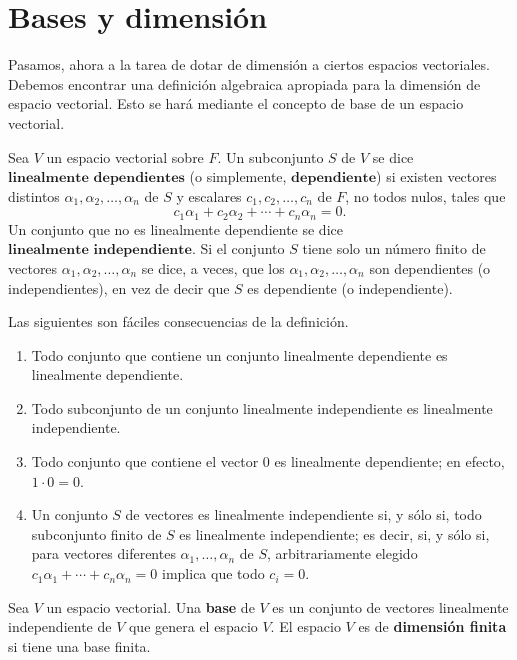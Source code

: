 \section{Bases y dimensión}

Pasamos, ahora a la tarea de dotar de dimensión a ciertos espacios vectoriales. Debemos encontrar una definición algebraica apropiada para la dimensión de espacio vectorial. Esto se hará mediante el concepto de base de un espacio vectorial.

\begin{def.}
    Sea $V$ un espacio vectorial sobre $F$. Un subconjunto $S$ de $V$ se dice $\textbf{linealmente dependientes}$ (o simplemente, $\textbf{dependiente}$) si existen vectores distintos $\alpha_1,\alpha_2,\ldots,\alpha_n$ de $S$ y escalares $c_1,c_2,\ldots,c_n$ de $F$, no todos nulos, tales que
    $$c_1\alpha_1+c_2\alpha_2+\cdots+c_n\alpha_n=0.$$
    Un conjunto que no es linealmente dependiente se dice $\textbf{linealmente independiente}$. Si el conjunto $S$ tiene solo un número finito de vectores $\alpha_1,\alpha_2,\ldots,\alpha_n$ se dice, a veces, que los $\alpha_1,\alpha_2,\ldots,\alpha_n$ son dependientes (o independientes), en vez de decir que $S$ es dependiente (o independiente).
\end{def.}

Las siguientes son fáciles consecuencias de la definición.

\begin{enumerate}[1.]

    \item Todo conjunto que contiene un conjunto linealmente dependiente es linealmente dependiente.
    \item Todo subconjunto de un conjunto linealmente independiente es linealmente independiente.
    \item Todo conjunto que contiene el vector $0$ es linealmente dependiente; en efecto, $1\cdot 0=0$.
    \item Un conjunto $S$ de vectores es linealmente independiente si, y sólo si, todo subconjunto finito de $S$ es linealmente independiente; es decir, si, y sólo si, para vectores diferentes $\alpha_1,\ldots,\alpha_n$ de $S$, arbitrariamente elegido $c_1\alpha_1+\cdots+c_n\alpha_n=0$ implica que todo $c_i=0$.

\end{enumerate}

\begin{def.}
    Sea $V$ un espacio vectorial. Una \textbf{base} de $V$ es un conjunto de vectores linealmente independiente de $V$ que genera el espacio $V$. El espacio $V$ es de \textbf{dimensión finita} si tiene una base finita.
\end{def.}


